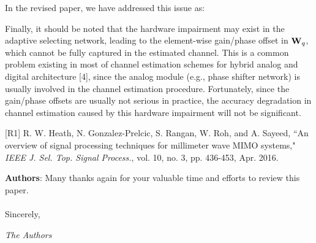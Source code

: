 \documentclass[a4paper,12pt]{article}
\begin{document}
{In the revised paper, we have addressed this issue as:
\begin{framed}
{\color{red} Finally, it should be noted that the hardware impairment may exist in the adaptive selecting network, leading to the element-wise gain/phase offset in ${{{\bf{W}}_q}}$, which cannot be fully captured in the estimated channel. This is a common problem existing in most of channel estimation schemes for hybrid analog and digital architecture [4], since the analog module (e.g., phase shifter network) is usually involved in the channel estimation procedure. Fortunately, since the gain/phase offsets are usually not serious in practice, the accuracy degradation in channel estimation caused by this hardware impairment will not be significant.}
\end{framed}

[R1] R. W. Heath, N. Gonzalez-Prelcic, S. Rangan, W. Roh, and A. Sayeed, ``An overview of signal processing techniques for millimeter wave MIMO systems," {\it IEEE J. Sel. Top. Signal Process.}, vol. 10, no. 3, pp. 436-453, Apr. 2016.



\vbox{}

{\color{blue} \textbf{Authors}: Many thanks again for your valuable time and efforts to review this paper.
\\
\\
Sincerely,

 {\it The Authors}}


}


\clearpage
\end{document}
